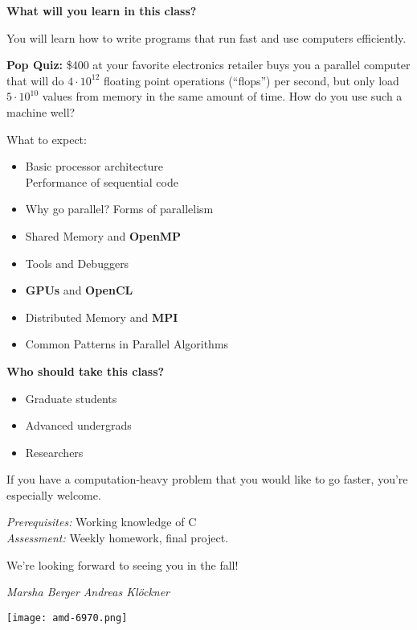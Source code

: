 \large

{\sffamily\Large\bfseries What will you learn in this class?}

You will learn how to write programs that run fast and use computers
efficiently.

\textbf{Pop Quiz:} \$400 at your favorite electronics retailer
buys you a parallel computer that will do
$4\cdot 10^{12}$ floating point operations (``flops'') per second,
but only load $5\cdot 10^{10}$ values from memory in the same
amount of time. How do you use such a machine well?

What to expect:
\vspace{-0.5em}
\begin{itemize}
\setlength{\itemsep}{-1mm}
  \item Basic processor architecture\\
    Performance of sequential code
  \item Why go parallel? Forms of parallelism
  \item Shared Memory and \textbf{OpenMP}
  \item Tools and Debuggers
  \item \textbf{GPUs} and \textbf{OpenCL}
  \item Distributed Memory and \textbf{MPI}
  \item Common Patterns in Parallel Algorithms
\end{itemize}

\columnbreak
{\sffamily\Large\bfseries Who should take this class?}

\vspace{-0.5em}
\begin{itemize}
\setlength{\itemsep}{-1mm}
  \item Graduate students
  \item Advanced undergrads
  \item Researchers
\end{itemize}
\vspace{-0.5em}
If you have a computation-heavy problem that you would like to go
faster, you're especially welcome.

\emph{Prerequisites:} Working knowledge of C\\
\emph{Assessment:} Weekly homework, final
project.

We're looking forward to seeing you in the fall!

\hfill \emph{Marsha Berger} \hfill \emph{Andreas Klöckner}

\centering
\texttt{[image: amd-6970.png]}
